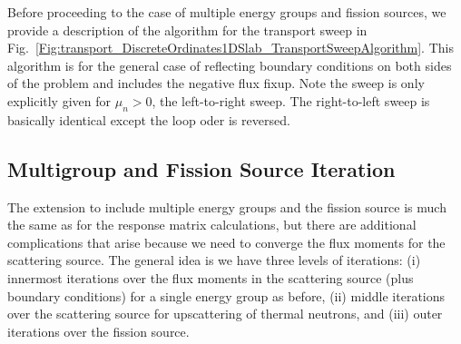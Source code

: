 Before proceeding to the case of multiple energy groups and fission sources, we provide a description of the algorithm for the transport sweep in Fig.~\ref{Fig:transport_DiscreteOrdinates1DSlab_TransportSweepAlgorithm}. This algorithm is for the general case of reflecting boundary conditions on both sides of the problem and includes the negative flux fixup. Note the sweep is only explicitly given for $\mu_n > 0$, the left-to-right sweep. The right-to-left sweep is basically identical except the loop oder is reversed.








\subsection{Multigroup and Fission Source Iteration}

The extension to include multiple energy groups and the fission source is much the same as for the response matrix calculations, but there are additional complications that arise because we need to converge the flux moments for the scattering source. The general idea is we have three levels of iterations: (i) innermost iterations over the flux moments in the scattering source (plus boundary conditions) for a single energy group as before, (ii) middle iterations over the scattering source for upscattering of thermal neutrons, and (iii) outer iterations over the fission source. 

